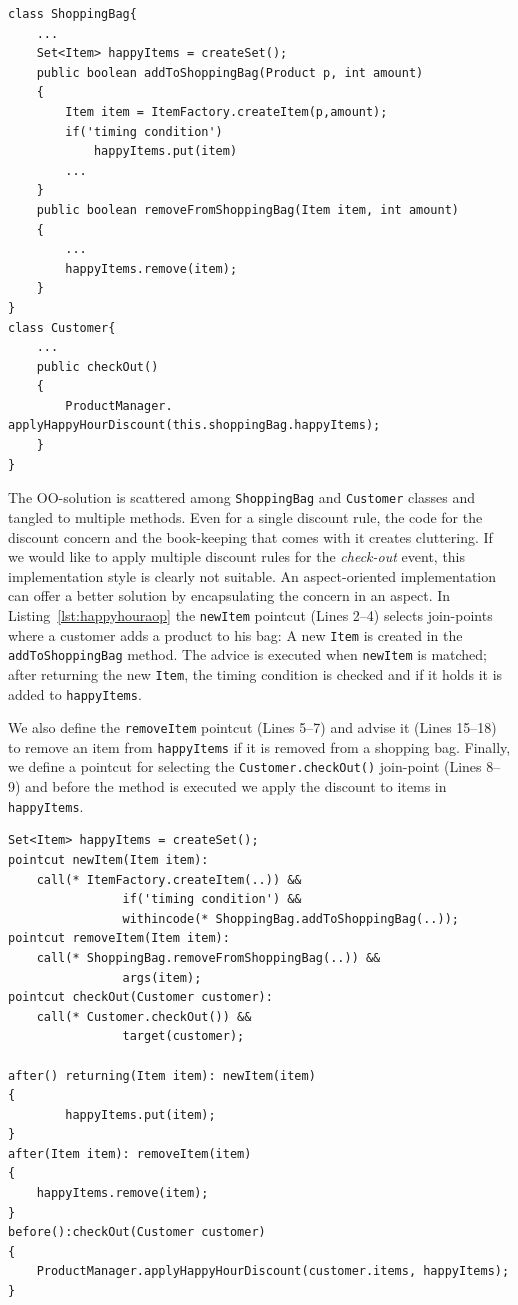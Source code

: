 \begin{lstlisting}[float, caption={A Java implementation of happy-hour discount rule}, label={lst:happyhour}]
class ShoppingBag{
	...
	Set<Item> happyItems = createSet();
	public boolean addToShoppingBag(Product p, int amount)
	{
		Item item = ItemFactory.createItem(p,amount);
		if('timing condition')
			happyItems.put(item)
		...
	}
	public boolean removeFromShoppingBag(Item item, int amount)
	{
		...
		happyItems.remove(item);
	}
}
class Customer{
	...
	public checkOut()
	{
		ProductManager. applyHappyHourDiscount(this.shoppingBag.happyItems);
	}
}
\end{lstlisting}

The OO-solution is scattered among \texttt{ShoppingBag} and \texttt{Customer} classes and tangled to multiple methods. Even for a single discount rule, the code for the discount concern and the book-keeping that comes with it creates cluttering. If we would like to apply multiple discount rules for the \emph{check-out} event, this implementation style is clearly not suitable.
An aspect-oriented implementation can offer a better solution by encapsulating the concern in an aspect. In Listing~\ref{lst:happyhouraop} the \texttt{newItem} pointcut (Lines 2--4) selects join-points where a customer adds a product to his bag: A new \texttt{Item} is created in the \texttt{addToShoppingBag} method. The advice is executed when \texttt{newItem} is matched; after returning the new \texttt{Item}, the timing condition is checked and if it holds it is added to \texttt{happyItems}. 

We also define the \texttt{removeItem} pointcut (Lines 5--7) and advise it (Lines 15--18) to remove an item from \texttt{happyItems} if it is removed from a shopping bag.
Finally, we define a pointcut for selecting the \texttt{Customer.checkOut()} join-point (Lines 8--9) and before the method is executed we apply the discount to items in \texttt{happyItems}.

\begin{lstlisting}[float, caption={An Aspectj implementation of happy-hour discount rule}, label={lst:happyhouraop}]
Set<Item> happyItems = createSet();
pointcut newItem(Item item): 
	call(* ItemFactory.createItem(..)) && 
				if('timing condition') && 
				withincode(* ShoppingBag.addToShoppingBag(..));
pointcut removeItem(Item item): 
	call(* ShoppingBag.removeFromShoppingBag(..)) && 
				args(item);
pointcut checkOut(Customer customer): 
	call(* Customer.checkOut()) && 
				target(customer);

after() returning(Item item): newItem(item)
{
		happyItems.put(item);
}
after(Item item): removeItem(item)
{
	happyItems.remove(item);
}
before():checkOut(Customer customer)
{
	ProductManager.applyHappyHourDiscount(customer.items, happyItems);
}
\end{lstlisting}

